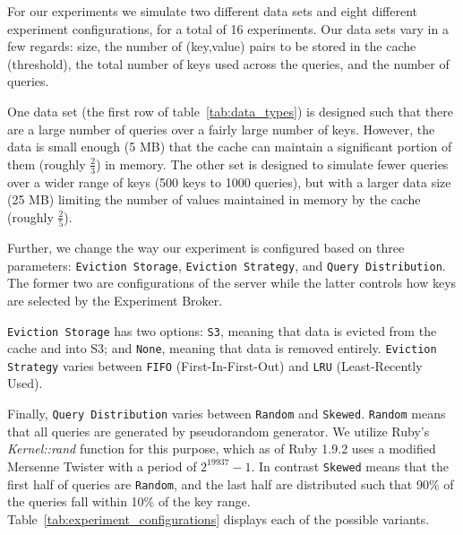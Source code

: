 For our experiments we simulate two different data sets and eight
different experiment configurations, for a total of 16 experiments. Our data
sets vary in a few regards: size, the number of (key,value) pairs to be stored
in the cache (threshold), the total number of keys used across the queries, and
the number of queries.

One data set (the first row of table~\ref{tab:data_types}) is designed such
that there are a large number of queries over a fairly large number of keys.
However, the data is small enough (5 MB) that the cache can maintain a
significant portion of them (roughly $\frac{2}{3}$) in memory. The other set is
designed to simulate fewer queries over a wider range of keys (500 keys to 1000
queries), but with a larger data size (25 MB) limiting the number of values
maintained in memory by the cache (roughly $\frac{2}{5}$).

Further, we change the way our experiment is configured based on three
parameters: {\tt Eviction Storage}, {\tt Eviction Strategy}, and {\tt Query
Distribution}. The former two are configurations of the server while the latter
controls how keys are selected by the Experiment Broker.

{\tt Eviction Storage} has two options: {\tt S3}, meaning that data is evicted
from the cache and into S3; and {\tt None}, meaning that data is removed
entirely. {\tt Eviction Strategy} varies between {\tt FIFO}
(First-In-First-Out) and {\tt LRU} (Least-Recently Used). 

Finally, {\tt Query Distribution} varies between {\tt Random} and {\tt Skewed}.
{\tt Random} means that all queries are generated by pseudorandom generator.
We utilize Ruby's \emph{Kernel::rand} function for this purpose, which as of
Ruby 1.9.2 uses a modified Mersenne Twister with a period of
$2^{19937}-1$\cite{ruby_rand}. In contrast {\tt Skewed} means that the first
half of queries are {\tt Random}, and the last half are distributed such that
90\% of the queries fall within 10\% of the key range.
Table~\ref{tab:experiment_configurations} displays each of the possible
variants.

